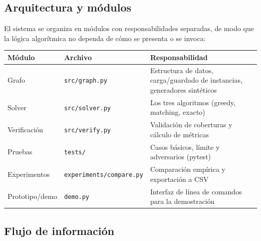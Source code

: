 \documentclass[11pt,a4paper]{article}
\begin{document}
\subsection{Arquitectura y módulos}
El sistema se organiza en módulos con responsabilidades separadas, de modo que la lógica
algorítmica no dependa de cómo se presenta o se invoca:

\begin{center}
\begin{tabular}{p{2.6cm}p{3.6cm}p{7.5cm}}
	\toprule
	\textbf{Módulo} & \textbf{Archivo} & \textbf{Responsabilidad} \\
	\midrule
	Grafo & \texttt{src/graph.py} & Estructura de datos, carga/guardado de instancias, generadores sintéticos \\
	Solver & \texttt{src/solver.py} & Los tres algoritmos (greedy, matching, exacto) \\
	Verificación & \texttt{src/verify.py} & Validación de coberturas y cálculo de métricas \\
	Pruebas & \texttt{tests/} & Casos básicos, límite y adversarios (pytest) \\
	Experimentos & \texttt{experiments/\allowbreak compare.py} & Comparación empírica y exportación a CSV \\
	Prototipo/demo & \texttt{demo.py} & Interfaz de línea de comandos para la demostración \\
	\bottomrule
\end{tabular}
\end{center}

\subsection{Flujo de información}
\begin{center}
\end{center}
\end{document}
